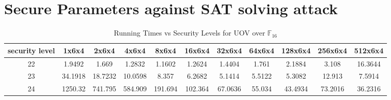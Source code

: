 \section{Secure Parameters against SAT solving attack}


\begin{table}[]
\centering
\caption{Running Times vs Security Levels for UOV over $\mathbb{F}_{16}$ }
\scriptsize
\label{my-label}
\begin{tabular}{|c|c|c|c|c|c|c|c|c|c|c|}
\hline
security level & 1x6x4 & 2x6x4 & 4x6x4 & 8x6x4 & 16x6x4 & 32x6x4 & 64x6x4 & 128x6x4 & 256x6x4 & 512x6x4 \\ \hline

22 & 1.9492 & 1.669 & 1.2832 & 1.1602 & 1.2624 & 1.4404 & 1.761 & 2.1884 & 3.108 & 16.3644 \\ \hline
23 & 34.1918 & 18.7232 & 10.0598 & 8.357 & 6.2682 & 5.1414 & 5.5122 & 5.3082 & 12.913 & 7.5914\\ \hline
24 & 1250.32 & 741.795 & 584.909 & 191.694 & 102.364 & 67.0636 & 55.034 & 43.4934 & 73.2016 & 36.2316 \\ \hline
\end{tabular}
\end{table}


